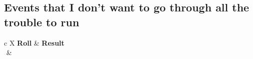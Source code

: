 \subsection{Events that I don't want to go through all the trouble to run}
\begin{DndTable}[]{c X}
    \textbf{Roll} & \textbf{Result} \\
    $ $ &  \\
\end{DndTable}
